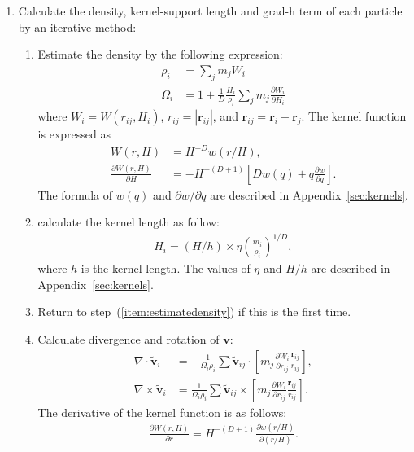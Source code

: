 \documentclass[fleqn,dvipdfmx]{article}
\begin{document}
\begin{enumerate}
\item Calculate the density, kernel-support length and grad-h term of
  each particle by an iterative method:
  \begin{enumerate}
  \item Estimate the density by the following
    expression: \label{item:estimatedensity}
    \begin{align}
      \rho_i &= \sum_j m_j W_i \\ \Omega_i &= 1 + \frac{1}{D}
      \frac{H_i}{\rho_i} \sum_j m_j \frac{\partial W_i}{\partial H_i}
    \end{align}
    where $W_i=W(r_{ij},H_i)$, $r_{ij}=|\bm{r}_{ij}|$, and
    $\bm{r}_{ij}=\bm{r}_i-\bm{r}_j$. The kernel function is expressed
    as
    \begin{align}
      W(r,H) &= H^{-D} w(r/H), \\ \frac{\partial
        W(r,H)}{\partial H} &= -H^{-(D+1)} \left[ D w(q) + q
        \frac{\partial w}{\partial q} \right].
    \end{align}
    The formula of $w(q)$ and $\partial w/\partial q$ are described in
    Appendix~\ref{sec:kernels}.
  \item calculate the kernel length as follow:
    \begin{align}
      H_i = (H/h) \times \eta \left( \frac{m_i}{\rho_i} \right)^{1/D},
    \end{align}
    where $h$ is the kernel length. The values of $\eta$ and $H/h$ are
    described in Appendix~\ref{sec:kernels}.
  \item Return to step~(\ref{item:estimatedensity}) if this is the
    first time.
  \item Calculate divergence and rotation of $\bm{v}$:
    \begin{align}
      \nabla \cdot \tilde{\bm{v}}_i &= - \frac{1}{\Omega_i \rho_i} \sum
      \tilde{\bm{v}}_{ij} \cdot \left[ m_j \frac{\partial
          W_i}{\partial r_{ij}} \frac{\bm{r}_{ij}}{r_{ij}} \right], \\
      \nabla \times \tilde{\bm{v}}_i &= \frac{1}{\Omega_i \rho_i} \sum
      \tilde{\bm{v}}_{ij} \times \left[ m_j \frac{\partial
          W_i}{\partial r_{ij}} \frac{\bm{r}_{ij}}{r_{ij}} \right].
    \end{align}
    The
    derivative of the kernel function is as follows:
    \begin{align}
      \frac{\partial W(r,H)}{\partial r} = H^{-(D+1)} \frac{\partial
        w(r/H)}{\partial (r/H)}.
    \end{align}
  \end{enumerate}
  

\end{enumerate}
\end{document}
